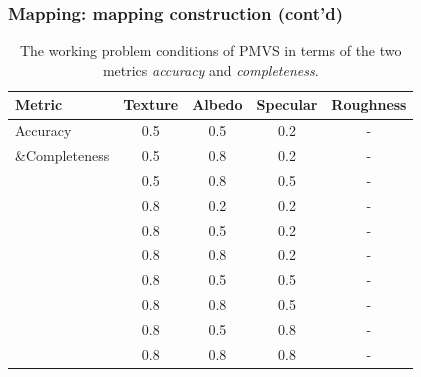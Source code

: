 \documentclass{beamer}
\begin{document}
\begin{frame}
\frametitle{Mapping: mapping construction (cont'd)}

\begin{table}[!htbp]
  \centering
  \begin{tabular}{l*{4}{c}}
  \toprule
  \textbf{Metric} & Texture & Albedo & Specular & Roughness\\
  \midrule
  Accuracy & 0.5 & 0.5 & 0.2 & -\\
  \&Completeness & 0.5 & 0.8 & 0.2 & -\\
           & 0.5 & 0.8 & 0.5 & -\\
           & 0.8 & 0.2 & 0.2 & -\\
           & 0.8 & 0.5 & 0.2 & -\\
           & 0.8 & 0.8 & 0.2 & -\\
           & 0.8 & 0.5 & 0.5 & -\\
           & 0.8 & 0.8 & 0.5 & -\\
           & 0.8 & 0.5 & 0.8 & -\\
           & 0.8 & 0.8 & 0.8 & -\\
  \bottomrule
  \end{tabular}
  \caption{The working problem conditions of PMVS in terms of the two metrics \textit{accuracy} and \textit{completeness}.}
  \label{tab:mvs_training_result}
\end{table}

\end{frame}


%         
%         

\end{document}
